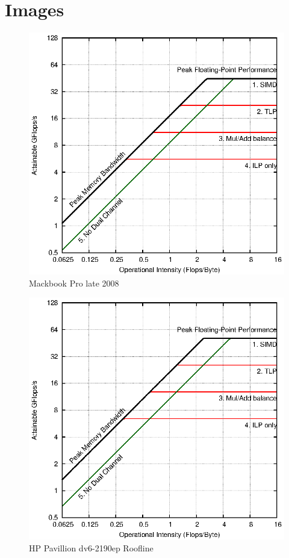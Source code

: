 \documentclass[a4paper,10pt,openright,openbib,twocolumn]{article}
\begin{document}
\section{Images}
\begin{figure}[!htp]
	\centering
	\begin{minipage}[t]{\linewidth}
		\includegraphics[width=\linewidth]{images/roofline_mbp.eps}
		\caption{Mackbook Pro late 2008 }
	\end{minipage}
\end{figure}
\begin{figure}[!htp]
	\centering
	\begin{minipage}[t]{\linewidth}
		\includegraphics[width=\linewidth]{images/roofline_hp.eps}
		\caption{HP Pavillion dv6-2190ep Roofline }
	\end{minipage}
\end{figure}
\end{document}
